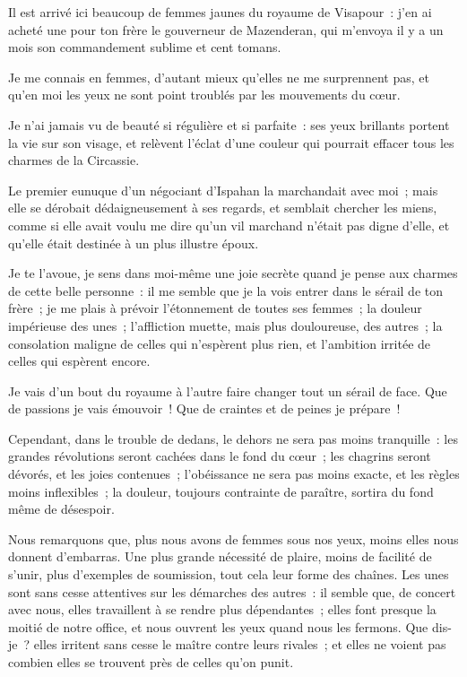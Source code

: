 \documentclass[french,twoside]{book} %
\begin{document}
\noindent Il est arrivé ici beaucoup de femmes jaunes du royaume de Visapour : j’en ai acheté une pour ton frère le gouverneur de Mazenderan, qui m’envoya il y a un mois son commandement sublime et cent tomans.\par
Je me connais en femmes, d’autant mieux qu’elles ne me surprennent pas, et qu’en moi les yeux ne sont point troublés par les mouvements du cœur.\par
Je n’ai jamais vu de beauté si régulière et si parfaite : ses yeux brillants portent la vie sur son visage, et relèvent l’éclat d’une couleur qui pourrait effacer tous les charmes de la Circassie.\par
Le premier eunuque d’un négociant d’Ispahan la marchandait avec moi ; mais elle se dérobait dédaigneusement à ses regards, et semblait chercher les miens, comme si elle avait voulu me dire qu’un vil marchand n’était pas digne d’elle, et qu’elle était destinée à un plus illustre époux.\par
Je te l’avoue, je sens dans moi-même une joie secrète quand je pense aux charmes de cette belle personne : il me semble que je la vois entrer dans le sérail de ton frère ; je me plais à prévoir l’étonnement de toutes ses femmes ; la douleur impérieuse des unes ; l’affliction muette, mais plus douloureuse, des autres ; la consolation maligne de celles qui n’espèrent plus rien, et l’ambition irritée de celles qui espèrent encore.\par
Je vais d’un bout du royaume à l’autre faire changer tout un sérail de face. Que de passions je vais émouvoir ! Que de craintes et de peines je prépare !\par
Cependant, dans le trouble de dedans, le dehors ne sera pas moins tranquille : les grandes révolutions seront cachées dans le fond du cœur ; les chagrins seront dévorés, et les joies contenues ; l’obéissance ne sera pas moins exacte, et les règles moins inflexibles ; la douleur, toujours contrainte de paraître, sortira du fond même de désespoir.\par
Nous remarquons que, plus nous avons de femmes sous nos yeux, moins elles nous donnent d’embarras. Une plus grande nécessité de plaire, moins de facilité de s’unir, plus d’exemples de soumission, tout cela leur forme des chaînes. Les unes sont sans cesse attentives sur les démarches des autres : il semble que, de concert avec nous, elles travaillent à se rendre plus dépendantes ; elles font presque la moitié de notre office, et nous ouvrent les yeux quand nous les fermons. Que dis-je ? elles irritent sans cesse le maître contre leurs rivales ; et elles ne voient pas combien elles se trouvent près de celles qu’on punit.\par
\end{document}
